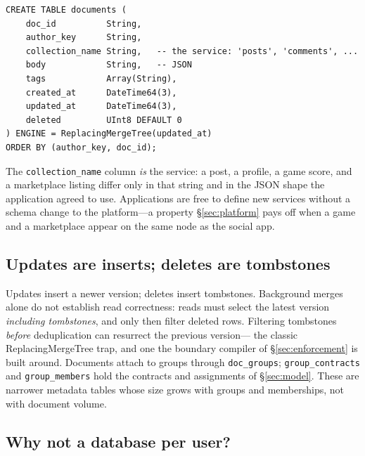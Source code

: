 \documentclass[sigconf, nonacm]{acmart}
\begin{document}
\begin{center}
\begin{minipage}{\columnwidth}
\begin{lstlisting}[style=sql]
CREATE TABLE documents (
    doc_id          String,
    author_key      String,
    collection_name String,   -- the service: 'posts', 'comments', ...
    body            String,   -- JSON
    tags            Array(String),
    created_at      DateTime64(3),
    updated_at      DateTime64(3),
    deleted         UInt8 DEFAULT 0
) ENGINE = ReplacingMergeTree(updated_at)
ORDER BY (author_key, doc_id);
\end{lstlisting}
\end{minipage}
\end{center}

The \texttt{collection\_name} column \emph{is} the service: a post, a
profile, a game score, and a marketplace listing differ only in that string
and in the JSON shape the application agreed to use. Applications are free to
define new services without a schema change to the platform---a property
\S\ref{sec:platform} pays off when a game and a marketplace appear on the
same node as the social app.

\subsection{Updates are inserts; deletes are tombstones}

Updates insert a newer version; deletes insert tombstones. Background merges
alone do not establish read correctness: reads must select the latest version
\emph{including tombstones}, and only then filter deleted rows. Filtering
tombstones \emph{before} deduplication can resurrect the previous version---
the classic ReplacingMergeTree trap, and one the boundary compiler of
\S\ref{sec:enforcement} is built around. Documents attach to groups through
\texttt{doc\_groups}; \texttt{group\_contracts} and \texttt{group\_members}
hold the contracts and assignments of \S\ref{sec:model}. These are narrower
metadata tables whose size grows with groups and memberships, not with
document volume.

\subsection{Why not a database per user?}
\end{document}
